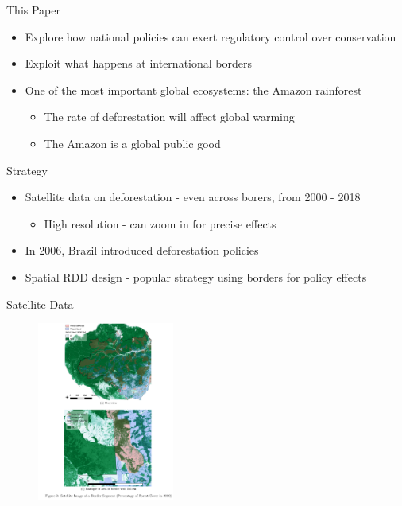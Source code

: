\documentclass[11pt,notes=hide,aspectratio=169,mathserif]{beamer}
\begin{document}
\begin{frame}{This Paper}
\begin{itemize}
\item Explore how national policies can exert regulatory control over conservation 
\item Exploit what happens at international borders 
\item One of the most important global ecosystems: the Amazon rainforest
\begin{itemize}
    \item The rate of deforestation will affect global warming
    \item The Amazon is a global public good
\end{itemize}
\end{itemize}
\end{frame}

\begin{frame}{Strategy}
\begin{itemize}
\item Satellite data on deforestation - even across borers, from 2000 - 2018 
\begin{itemize}
\item High resolution - can zoom in for precise effects 
\end{itemize}
\item In 2006, Brazil introduced deforestation policies
\item Spatial RDD design - popular strategy using borders for policy effects
\end{itemize}
\end{frame}

\begin{frame}{Satellite Data}
\begin{figure}
\centering
\includegraphics[width=0.4\textwidth]{inputs/fig2.2.png}
\end{figure}
\end{frame}
\end{document}
